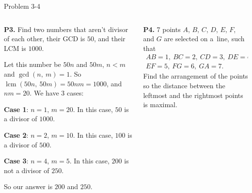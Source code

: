\documentclass[9pt,aspectratio=169]{beamer}
\DeclareMathOperator{\lcm}{lcm}
\begin{document}
\begin{frame}{Problem 3-4}
  \begin{columns}[T]
    \begin{column}{0.5\textwidth}
      \begin{problem}
        \textbf{P3.} Find two numbers that aren't divisor of each other, their GCD is $50$, and their LCM is $1000$.
      \end{problem}\pause
      Let this number be $50n$ and $50m$, $n < m$ and $\gcd(n,\ m) = 1$. So $\lcm(50n,\ 50m) = 50nm = 1000$, and $nm = 20$. We have $3$ cases:\pause

      \textbf{Case 1}: $n = 1$, $m = 20$. In this case, $50$ is a divisor of $1000$.\pause

      \textbf{Case 2}: $n = 2$, $m = 10$. In this case, $100$ is a divisor of $500$.\pause

      \textbf{Case 3}: $n = 4$, $m = 5$. In this case, $200$ is not a divisor of $250$.\pause

      So our answer is $200$ and $250$.\pause
    \end{column}
    \begin{column}{0.5\textwidth}
      \vspace*{-2.2\baselineskip}
      \begin{problem}
        \textbf{P4.} 7 points $A$, $B$, $C$, $D$, $E$, $F$, and $G$ are selected on a~line, such that
        \begin{gather*}
          AB = 1,\ BC = 2,\ CD = 3,\ DE = 4,\\ 
          EF = 5,\ FG = 6,\ GA = 7.
        \end{gather*} 
        Find the arrangement of the points so the distance between the leftmost and the rightmost points is maximal.
      \end{problem}\pause


\end{column}
\end{columns}
\end{frame}
\end{document}
